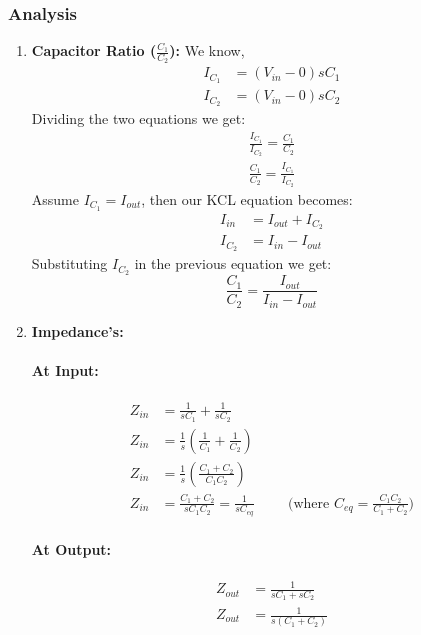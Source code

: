 \subsubsection{Analysis}
\begin{enumerate}
  \item \textbf{Capacitor Ratio (\(\frac{C_1}{C_2}\)):}
    We know,
    \begin{align*}
      I_{C_1} &= (V_{in} - 0)sC_1 \\
      I_{C_2} &= (V_{in} - 0)sC_2
    \end{align*}
    Dividing the two equations we get:
    \begin{align*}
      \frac{I_{C_1}}{I_{C_2}} = \frac{C_1}{C_2} \\
      \frac{C_1}{C_2} = \frac{I_{C_1}}{I_{C_2}}
    \end{align*}
    Assume \(I_{C_1} = I_{out}\), then our KCL
    equation becomes:
    \begin{align*}
      I_{in} &= I_{out} + I_{C_2} \\
      I_{C_2} &= I_{in} - I_{out}
    \end{align*}
    Substituting \(I_{C_2}\) in the previous equation
    we get:
    \[
      \frac{C_1}{C_2} = \frac{I_{out}}{I_{in} - I_{out}}
    \]
  \item \textbf{Impedance's:}
    \paragraph{At Input:}
      \begin{align*}
        Z_{in} &= \frac{1}{sC_1} + \frac{1}{sC_2} \\
        Z_{in} &= \frac{1}{s}\left(\frac{1}{C_1} + \frac{1}{C_2}\right) \\
        Z_{in} &= \frac{1}{s}\left(\frac{C_1 + C_2}{C_1 C_2}\right) \\
        Z_{in} &= \frac{C_1 + C_2}{s C_1 C_2} = \frac{1}{sC_{eq}} \hspace{1cm} \text{(where \(C_{eq} = \frac{C_1 C_2}{C_1 + C_2}\))}
      \end{align*}
    \paragraph{At Output:}
      \begin{align*}
        Z_{out} &= \frac{1}{sC_1 + sC_2} \\
        Z_{out} &= \frac{1}{s(C_1 + C_2)} \\
      \end{align*}
\end{enumerate}

